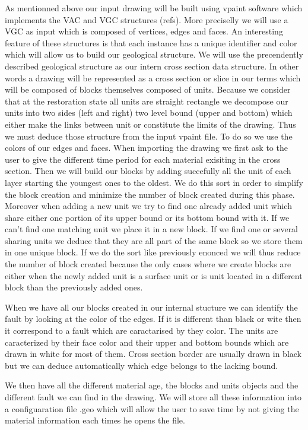 \documentclass[12pt, a4paper]{memoir} %
\begin{document}
As mentionned above our input drawing will be built using vpaint software which implements the VAC and VGC structures (refs).
More preciselly we will use a VGC as input which is composed of vertices, edges and faces. An interesting feature of these structures is that each instance has a unique identifier and color which will allow us to build our geological structure.
We will use the precendently described geological structure as our intern cross section data structure. In other words a drawing will be represented as a cross section or slice in our terms which will be composed of blocks themselves composed of units. Because we consider that at the restoration state all units are straight rectangle we decompose our units into two sides (left and right) two level bound (upper and bottom) which either make the links between unit or constitute the limits of the drawing. Thus we must deduce those structure from the input vpaint file. 
To do so we use the colors of our edges and faces. When importing the drawing we first ask to the user to give the different time period for each material exisiting in the cross section. Then we will build our blocks by adding succefully all the unit of each layer starting the youngest ones to the oldest. We do this sort in order to simplify the block creation and minimize the number of block created during this phase. Moreover when adding a new unit we try to find one already added unit which share either one portion of its upper bound  or its bottom bound with it. If we can't find one matching unit we place it in a new block. If we find one or several sharing units we deduce that they are all part of the same block so we store them in one unique block. If we do the sort like previously enonced we will thus reduce the number of block created because the only cases where we create blocks are either when the newly added unit is a surface unit or is unit located in a different block than the previously added ones.

When we have all our blocks created in our internal stucture we can identify the fault by looking at the color of the edges. If it is different than black or wite then it correspond to a fault which are caractarised by they color. The units are caracterized by their face color and their upper and bottom bounds which are drawn in white for most of them. Cross section border are usually drawn in black but we can deduce automatically which edge belongs to the lacking bound.

We then have all the different material age, the blocks and units objects and the different fault we can find in the drawing. We will store all these information into a configuaration file .geo which will allow the user to save time by not giving the material information each times he opens the file.
\end{document}
